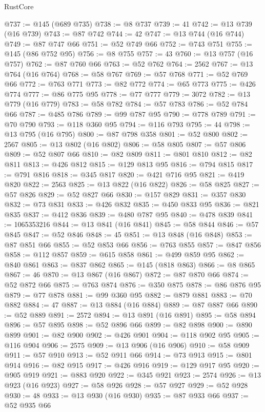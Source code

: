 \begin{lexlean}{RustCore}
\begin{coremodule}
@737 := @145 (@689 @735)
@738 := @8 @737
@739 := 41
@742 := @13 @739 (@16 @739)
@743 := @87 @742
@744 := 42
@747 := @13 @744 (@16 @744)
@749 := @87 @747 @66
@751 := @52 @749 @66
@752 := @743 @751
@755 := @145 (@86 @752 @95)
@756 := @8 @755
@757 := 43
@760 := @13 @757 (@16 @757)
@762 := @87 @760 @66
@763 := @52 @762
@764 := 2562
@767 := @13 @764 (@16 @764)
@768 := @58 @767
@769 := @57 @768
@771 := @52 @769 @66
@772 := @763 @771
@773 := @82 @772
@774 := @65 @773
@775 := @426 @774
@777 := @86 @775 @95
@778 := @77 @777
@779 := 3072
@782 := @13 @779 (@16 @779)
@783 := @58 @782
@784 := @57 @783
@786 := @52 @784 @66
@787 := @485 @786
@789 := @99 @787 @95
@790 := @778 @789
@791 := @70 @790
@793 := @118 @360 @95
@794 := @116 @793
@795 := 44
@798 := @13 @795 (@16 @795)
@800 := @87 @798 @358
@801 := @52 @800
@802 := 2567
@805 := @13 @802 (@16 @802)
@806 := @58 @805
@807 := @57 @806
@809 := @52 @807 @66
@810 := @82 @809
@811 := @801 @810
@812 := @82 @811
@813 := @426 @812
@815 := @129 @813 @95
@816 := @794 @815
@817 := @791 @816
@818 := @345 @817
@820 := @421 @716 @95
@821 := @419 @820
@822 := 2563
@825 := @13 @822 (@16 @822)
@826 := @58 @825
@827 := @57 @826
@829 := @52 @827 @66
@830 := @157 @829
@831 := @357 @830
@832 := @73 @831
@833 := @426 @832
@835 := @450 @833 @95
@836 := @821 @835
@837 := @412 @836
@839 := @480 @787 @95
@840 := @478 @839
@841 := 1065353216
@844 := @13 @841 (@16 @841)
@845 := @58 @844
@846 := @57 @845
@847 := @52 @846
@848 := 45
@851 := @13 @848 (@16 @848)
@853 := @87 @851 @66
@855 := @52 @853 @66
@856 := @763 @855
@857 := @847 @856
@858 := @112 @857
@859 := @615 @858
@861 := @499 @859 @95
@862 := @840 @861
@863 := @837 @862
@865 := @145 (@818 @863)
@866 := @8 @865
@867 := 46
@870 := @13 @867 (@16 @867)
@872 := @87 @870 @66
@874 := @52 @872 @66
@875 := @763 @874
@876 := @350 @875
@878 := @86 @876 @95
@879 := @77 @878
@881 := @99 @360 @95
@882 := @879 @881
@883 := @70 @882
@884 := 47
@887 := @13 @884 (@16 @884)
@889 := @87 @887 @66
@890 := @52 @889
@891 := 2572
@894 := @13 @891 (@16 @891)
@895 := @58 @894
@896 := @57 @895
@898 := @52 @896 @66
@899 := @82 @898
@900 := @890 @899
@901 := @82 @900
@902 := @426 @901
@904 := @118 @902 @95
@905 := @116 @904
@906 := 2575
@909 := @13 @906 (@16 @906)
@910 := @58 @909
@911 := @57 @910
@913 := @52 @911 @66
@914 := @73 @913
@915 := @801 @914
@916 := @82 @915
@917 := @426 @916
@919 := @129 @917 @95
@920 := @905 @919
@921 := @883 @920
@922 := @345 @921
@923 := 2574
@926 := @13 @923 (@16 @923)
@927 := @58 @926
@928 := @57 @927
@929 := @52 @928
@930 := 48
@933 := @13 @930 (@16 @930)
@935 := @87 @933 @66
@937 := @52 @935 @66

\end{coremodule}
\end{lexlean}
